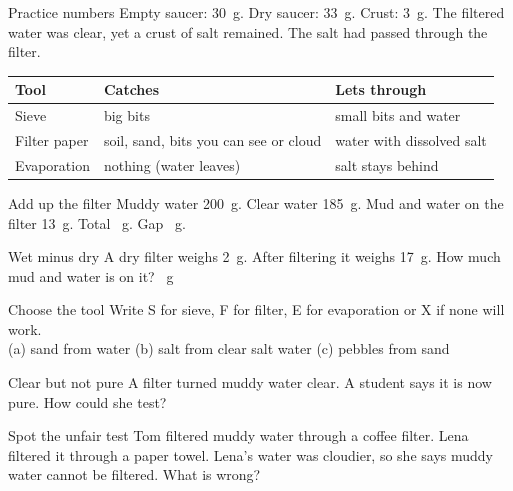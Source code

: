 \begin{worked}{Practice numbers}
Empty saucer: 30~g. Dry saucer: 33~g. Crust: 3~g. The filtered water was clear, yet a crust of salt remained. The salt had passed through the filter.
\end{worked}

\begin{center}
\sffamily\small\renewcommand{\arraystretch}{1.5}
\begin{tabular}{@{}p{3.6cm}p{3.5cm}p{3.5cm}@{}}
\toprule
\textbf{Tool} & \textbf{Catches} & \textbf{Lets through}\\
\midrule
Sieve & big bits & small bits and water\\
Filter paper & soil, sand, bits you can see or cloud & water with dissolved salt\\
Evaporation & nothing (water leaves) & salt stays behind\\
\bottomrule
\end{tabular}
\end{center}

\clearpage

\begin{puzzle}{Add up the filter}
Muddy water 200~g. Clear water 185~g. Mud and water on the filter 13~g. Total \wline[1.6cm]~g. Gap \wline[1.6cm]~g.
\end{puzzle}

\begin{puzzle}{Wet minus dry}
A dry filter weighs 2~g. After filtering it weighs 17~g. How much mud and water is on it? \wline[1.6cm]~g
\end{puzzle}

\begin{puzzle}{Choose the tool}
Write S for sieve, F for filter, E for evaporation or X if none will work.\\
(a) sand from water \wline[1cm] \quad (b) salt from clear salt water \wline[1cm] \quad (c) pebbles from sand \wline[1cm]
\end{puzzle}

\begin{puzzle}{Clear but not pure}
A filter turned muddy water clear. A student says it is now pure. How could she test? \wline[6cm]
\end{puzzle}

\begin{puzzle}{Spot the unfair test}
Tom filtered muddy water through a coffee filter. Lena filtered it through a paper towel. Lena's water was cloudier, so she says muddy water cannot be filtered. What is wrong? \wline[6cm]
\end{puzzle}

